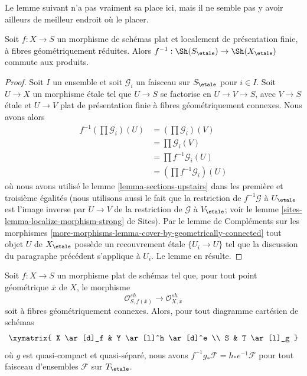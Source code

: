 \noindent
Le lemme suivant n'a pas vraiment sa place ici, mais il ne semble
pas y avoir ailleurs de meilleur endroit où le placer.

\begin{lemma}
\label{lemma-fppf-reduced-fibres-pullback-products}
Soit $f : X \to S$ un morphisme de schémas plat et
localement de présentation finie, à fibres géométriquement réduites.
Alors $f^{-1} : \Sh(S_\etale) \to \Sh(X_\etale)$ commute
aux produits.
\end{lemma}

\begin{proof}
Soit $I$ un ensemble et soit $\mathcal{G}_i$ un faisceau sur $S_\etale$
pour $i \in I$.
Soit $U \to X$ un morphisme étale tel que $U \to S$ se factorise en
$U \to V \to S$, avec $V \to S$ étale et $U \to V$ plat de
présentation finie à fibres géométriquement connexes. Nous avons alors
\begin{align*}
f^{-1}(\prod \mathcal{G}_i)(U)
& =
(\prod \mathcal{G}_i)(V) \\
& =
\prod \mathcal{G}_i(V) \\
& =
\prod f^{-1}\mathcal{G}_i(U) \\
& =
(\prod f^{-1}\mathcal{G}_i)(U)
\end{align*}
où nous avons utilisé le lemme \ref{lemma-sections-upstairs}
dans les première et troisième égalités
(nous utilisons aussi le fait que la restriction de $f^{-1}\mathcal{G}$
à $U_\etale$ est l'image inverse par $U \to V$ de la restriction de
$\mathcal{G}$ à $V_\etale$; voir le
lemme \ref{sites-lemma-localize-morphism-strong} de Sites).
Par le lemme de Compléments sur les morphismes
\ref{more-morphisms-lemma-cover-by-geometrically-connected}
tout objet $U$ de $X_\etale$ possède un recouvrement étale
$\{U_i \to U\}$ tel que la discussion du paragraphe
précédent s'applique à $U_i$. Le lemme en résulte.
\end{proof}

\begin{lemma}
\label{lemma-base-change-f-star}
Soit $f : X \to S$ un morphisme plat de schémas tel
que, pour tout point géométrique $\overline{x}$ de $X$, le morphisme
$$
\mathcal{O}_{S, f(\overline{x})}^{sh}
\longrightarrow
\mathcal{O}_{X, \overline{x}}^{sh}
$$
soit à fibres géométriquement connexes. Alors, pour tout
diagramme cartésien de schémas
$$
\xymatrix{
X \ar[d]_f & Y \ar[l]^h \ar[d]^e \\
S & T \ar[l]_g
}
$$
où $g$ est quasi-compact et quasi-séparé, nous avons
$f^{-1}g_*\mathcal{F} = h_*e^{-1}\mathcal{F}$
pour tout faisceau d'ensembles $\mathcal{F}$ sur $T_\etale$.
\end{lemma}

